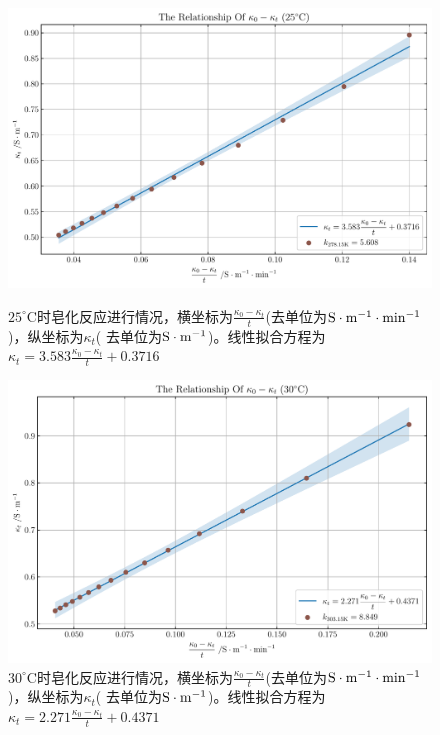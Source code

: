 \documentclass[UTF8,AutoFakeBold,a4paper]{article}
\begin{document}
\begin{figure}[h]
	\centering
	\includegraphics[scale=0.6]{速率常数1}
	\caption{$25^{\circ}$C时皂化反应进行情况，横坐标为$\displaystyle\frac{\kappa_{0} - \kappa_{t}}{t}$(去单位为$\rm{S}\cdot\rm{m}^{-1}\cdot\rm{min}^{-1}$)，纵坐标为$\kappa_{t}$( 去单位为$\rm{S}\cdot\rm{m}^{-1}$)。线性拟合方程为\textcolor[rgb]{0.54,0.13,0.33}{$\kappa_{t} = 3.583 \displaystyle\frac{\kappa_{0} - \kappa_{t}}{t} + 0.3716$}}
	\label{fi3}
\vspace*{20pt}
	\centering
	\includegraphics[scale=0.6]{速率常数2}
	\caption{$30^{\circ}$C时皂化反应进行情况，横坐标为$\displaystyle\frac{\kappa_{0} - \kappa_{t}}{t}$(去单位为$\rm{S}\cdot\rm{m}^{-1}\cdot\rm{min}^{-1}$)，纵坐标为$\kappa_{t}$( 去单位为$\rm{S}\cdot\rm{m}^{-1}$)。线性拟合方程为\textcolor[rgb]{0.54,0.13,0.33}{$\kappa_{t} = 2.271 \displaystyle\frac{\kappa_{0} - \kappa_{t}}{t} + 0.4371$}}
	\label{fi3}
\end{figure}
\end{document}
